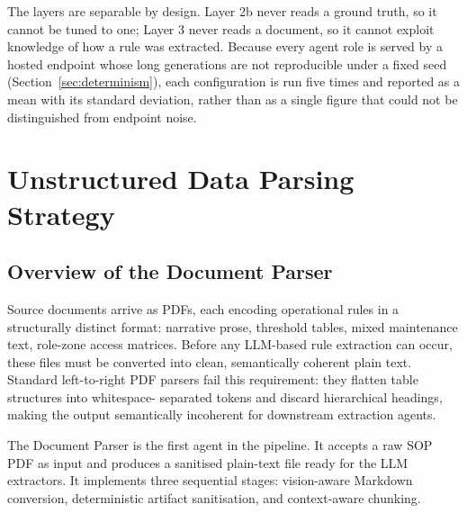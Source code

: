 \documentclass[11pt]{article}
\begin{document}
\label{sec:layer_separation}
The layers are separable by design. Layer 2b never reads a ground truth, so it
cannot be tuned to one; Layer 3 never reads a document, so it cannot exploit
knowledge of how a rule was extracted. Because every agent role is served by a
hosted endpoint whose long generations are not reproducible under a fixed seed
(Section~\ref{sec:determinism}), each configuration is run five times and
reported as a mean with its standard deviation, rather than as a single figure
that could not be distinguished from endpoint noise.

\section{Unstructured Data Parsing Strategy}
\label{sec:unstructured_parsing}

\subsection{Overview of the Document Parser}
Source documents arrive as PDFs, each encoding operational rules in a
structurally distinct format: narrative prose, threshold tables, mixed
maintenance text, role-zone access matrices. Before any LLM-based rule extraction
can occur, these files must be converted into clean, semantically coherent plain
text. Standard left-to-right
PDF parsers fail this requirement: they flatten table structures into whitespace-
separated tokens and discard hierarchical headings, making the output semantically
incoherent for downstream extraction agents.

The Document Parser is the first agent in the
pipeline. It accepts a raw SOP PDF as input and produces a sanitised plain-text
file ready for the LLM extractors. It implements three sequential stages: vision-aware
Markdown conversion, deterministic artifact sanitisation, and context-aware chunking.

\end{document}
